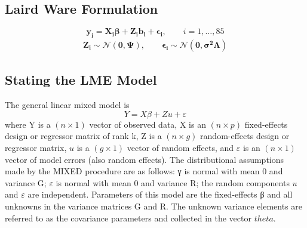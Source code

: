 \documentclass[12pt, a4paper]{article}
\begin{document}
\subsection{Laird Ware Formulation}
\begin{equation*}
\boldsymbol{y_{i}} = \boldsymbol{X_{i}\beta}  + \boldsymbol{Z_{i}b_{i}} + \boldsymbol{\epsilon_{i}}, \qquad i=1,\dots,85
\end{equation*}
\begin{eqnarray*}
	\boldsymbol{Z_{i}} \sim \mathcal{N}(\boldsymbol{0,\Psi}),\qquad
	\boldsymbol{\epsilon_{i}} \sim \mathcal{N}(\boldsymbol{0,\sigma^2\Lambda})
\end{eqnarray*}





\subsection{Stating the LME Model}
The general linear mixed
model is
\[
Y = X\beta + Zu + \varepsilon\]
where Y is a $(n\times1)$ vector of observed data, X is an $(n\times p)$ fixed-effects design or regressor matrix of rank
k, Z is a $(n \times g)$ random-effects design or regressor matrix, $u$ is a $(g \times 1)$ vector of random effects, and $\varepsilon$ is
an $(n\times1)$ vector of model errors (also random effects). The distributional assumptions made by the MIXED
procedure are as follows: γ is normal with mean 0 and variance G; $\varepsilon$ is normal with mean 0 and variance
R; the random components $u$ and $\varepsilon$ are independent. Parameters of this model are the fixed-effects β and
all unknowns in the variance matrices G and R. The unknown variance elements are referred to as the
covariance parameters and collected in the vector $theta$.
\end{document}
